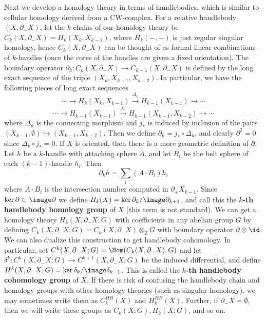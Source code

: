 Next we develop a homology theory in terms of handlebodies, which is similar to cellular homology derived from a CW-complex. For a relative handlebody $(X,\partial_- X)$, let the $k$-chains of our homology theory be $C_k(X,\partial_-X) = H_k(X_k,X_{k-1})$, where $H_k(-,-)$ is just regular singular homology, hence $C_k(X,\partial_-X)$ can be thought of as formal linear combinations of $k$-handles (once the cores of the handles are given a fixed orientation). The boundary operator $\partial_k : C_k(X,\partial_-X) \rightarrow C_{k-1}(X,\partial_-X)$ is defined by the long exact sequence of the triple $(X_k,X_{k-1},X_{k-2})$. In particular, we have the following pieces of long exact sequences
\[ \cdots \longrightarrow H_k(X_k,X_{k-1}) \stackrel{\Delta_k}{\longrightarrow} H_{k-1}(X_{k-1}) \longrightarrow \cdots \]
\[ \cdots \longrightarrow H_{k-1}(X_{k-1}) \stackrel{j_*}{\longrightarrow} H_{k-1}(X_{k-1},X_{k-2}) \longrightarrow \cdots \]
where $\Delta_k$ is the connecting morphism and $j_*$ is induced by inclusion of the pairs $(X_{k-1},\emptyset) \hookrightarrow (X_{k-1},X_{k-2})$. Then we define $\partial_k = j_* \circ \Delta_k$, and clearly $\partial^2 = 0$ since $\Delta_k \circ j_* = 0$. If $X$ is oriented, then there is a more geometric definition of $\partial$. Let $h$ be a $k$-handle with attaching sphere $A$, and let $B_i$ be the belt sphere of each $(k-1)$-handle $h_i$. Then
\begin{equation}
\label{handlebody homology differential}
\partial_k h = \sum_i (A \cdot B_i) h_i
\end{equation}
where $A \cdot B_i$ is the intersection number computed in $\partial_+ X_{k-1}$. Since $\ker \partial \subset \image \partial$ we define $H_k(X) = \ker \partial_k / \image \partial_{k+1}$, and call this the \textbf{$k$-th handlebody homology group} of $X$ (this term is not standard). We can get a homology theory $H_k(X,\partial_-X;G)$ with coefficients in any abelian group $G$ by defining $C_k(X,\partial_-X;G) = C_k(X,\partial_-X) \otimes_{\mathbb Z} G$ with boundary operator $\partial \otimes \id$. We can also dualize this construction to get handlebody cohomology. In particular, set $C^k(X,\partial_-X;G) = \Hom(C_k(X,\partial_-X),G)$ and let $\delta^k : C^k(X,\partial_-X;G) \rightarrow C^{k+1}(X,\partial_-X;G)$ be the induced differential, and define $H^k(X,\partial_-X;G) = \ker \delta_k / \image \delta_{k-1}$. This is called the \textbf{$k$-th handlebody cohomology group} of $X$. If there is risk of confusing the handlebody chain and homology groups with other homology theories (such as singular homology), we may sometimes write them as $C_k^{HB}(X)$ and $H_k^{HB}(X)$. Further, if $\partial_-X=\emptyset$, then we will write these groups as $C_k(X;G),H_k(X;G)$, and so on.

